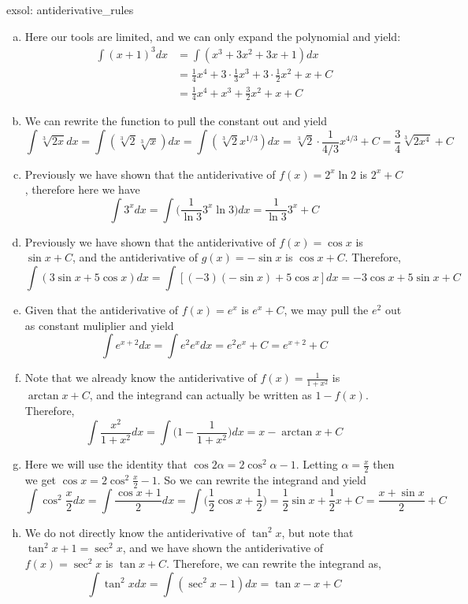 \begin{exsol}[]{exsol: antiderivative_rules}
    \begin{enumerate}[a)]
        \item Here our tools are limited, and we can only expand the polynomial and yield:
        \begin{align*}
            \int (x+1)^3 dx &= \int (x^3 + 3x^2 + 3x + 1) dx \\
            &= \frac{1}{4} x^4 + 3\cdot\frac{1}{3} x^3 + 3\cdot\frac{1}{2}x^2 + x + C\\
            &= \frac{1}{4} x^4 + x^3 + \frac{3}{2}x^2 + x + C
        \end{align*}
        \item We can rewrite the function to pull the constant out and yield
        \[\int \sqrt[3]{2x} dx = \int (\sqrt[3]{2} \sqrt[3]{x}) dx = \int (\sqrt[3]{2} x^{1/3}) dx = \sqrt[3]{2} \cdot \frac{1}{4/3}x^{4/3} + C = \frac{3}{4}\sqrt[3]{2x^4} + C\]
        \item Previously we have shown that the antiderivative of $f(x) = 2^x \ln 2$ is $2^x + C$, therefore here we have
        \[\int 3^x dx = \int \Big(\frac{1}{\ln 3}3^x\ln 3\Big) dx = \frac{1}{\ln 3} 3^x + C\]
        \item Previously we have shown that the antiderivative of $f(x) = \cos x$ is $\sin x + C$, and the antiderivative of $g(x) = -\sin x$ is $\cos x + C$.  Therefore,
        \[\int (3\sin x + 5\cos x) dx = \int [(-3)(-\sin x) + 5\cos x] dx = -3\cos x + 5\sin x + C\]
        \item Given that the antiderivative of $f(x) = e^x$ is $e^x + C$, we may pull the $e^2$ out as constant muliplier and yield
        \[\int e^{x+2} dx = \int e^2e^x dx = e^2e^x + C = e^{x+2} + C\]
        \item Note that we already know the antiderivative of $f(x) = \frac{1}{1+x^2}$ is $\arctan x + C$, and the integrand can actually be written as $1-f(x)$.  Therefore,
        \[\int \frac{x^2}{1+x^2} dx = \int \Big(1-\frac{1}{1+x^2}\Big)dx = x - \arctan x + C\]
        \item Here we will use the identity that $\cos 2\alpha = 2\cos^2 \alpha - 1$.  Letting $\alpha = \frac{x}{2}$ then we get $\cos x = 2 \cos^2 \frac{x}{2} - 1$.  So we can rewrite the integrand and yield
        \[\int \cos^2 \frac{x}{2} dx = \int \frac{\cos x + 1}{2} dx = \int \Big(\frac{1}{2}\cos x + \frac{1}{2}\Big) = \frac{1}{2}\sin x + \frac{1}{2} x + C = \frac{x + \sin x}{2} + C\]
        \item We do not directly know the antiderivative of $\tan^2 x$, but note that $\tan^2 x + 1 = \sec^2 x$, and we have shown the antiderivative of $f(x) = \sec^2 x$ is $\tan x + C$.  Therefore, we can rewrite the integrand as,
        \[\int \tan^2 x dx = \int (\sec^2 x - 1) dx = \tan x - x + C\]
    \end{enumerate}
\end{exsol}

